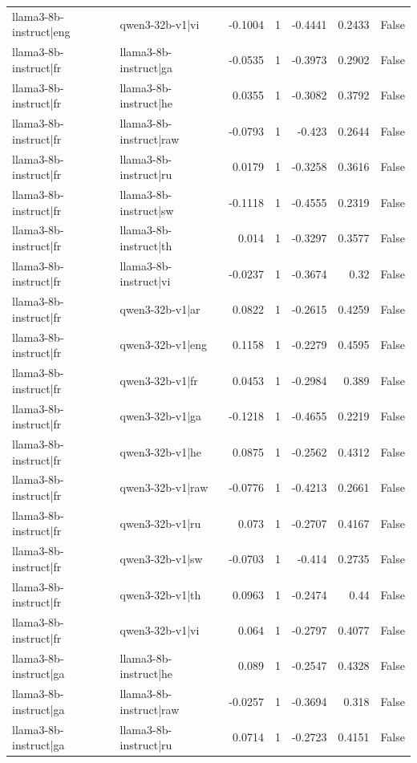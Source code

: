 \begin{table}
\begin{tabular}{l l r r r r l}
llama3-8b-instruct|eng & qwen3-32b-v1|vi & -0.1004 & 1 & -0.4441 & 0.2433 & False \\
llama3-8b-instruct|fr & llama3-8b-instruct|ga & -0.0535 & 1 & -0.3973 & 0.2902 & False \\
llama3-8b-instruct|fr & llama3-8b-instruct|he & 0.0355 & 1 & -0.3082 & 0.3792 & False \\
llama3-8b-instruct|fr & llama3-8b-instruct|raw & -0.0793 & 1 & -0.423 & 0.2644 & False \\
llama3-8b-instruct|fr & llama3-8b-instruct|ru & 0.0179 & 1 & -0.3258 & 0.3616 & False \\
llama3-8b-instruct|fr & llama3-8b-instruct|sw & -0.1118 & 1 & -0.4555 & 0.2319 & False \\
llama3-8b-instruct|fr & llama3-8b-instruct|th & 0.014 & 1 & -0.3297 & 0.3577 & False \\
llama3-8b-instruct|fr & llama3-8b-instruct|vi & -0.0237 & 1 & -0.3674 & 0.32 & False \\
llama3-8b-instruct|fr & qwen3-32b-v1|ar & 0.0822 & 1 & -0.2615 & 0.4259 & False \\
llama3-8b-instruct|fr & qwen3-32b-v1|eng & 0.1158 & 1 & -0.2279 & 0.4595 & False \\
llama3-8b-instruct|fr & qwen3-32b-v1|fr & 0.0453 & 1 & -0.2984 & 0.389 & False \\
llama3-8b-instruct|fr & qwen3-32b-v1|ga & -0.1218 & 1 & -0.4655 & 0.2219 & False \\
llama3-8b-instruct|fr & qwen3-32b-v1|he & 0.0875 & 1 & -0.2562 & 0.4312 & False \\
llama3-8b-instruct|fr & qwen3-32b-v1|raw & -0.0776 & 1 & -0.4213 & 0.2661 & False \\
llama3-8b-instruct|fr & qwen3-32b-v1|ru & 0.073 & 1 & -0.2707 & 0.4167 & False \\
llama3-8b-instruct|fr & qwen3-32b-v1|sw & -0.0703 & 1 & -0.414 & 0.2735 & False \\
llama3-8b-instruct|fr & qwen3-32b-v1|th & 0.0963 & 1 & -0.2474 & 0.44 & False \\
llama3-8b-instruct|fr & qwen3-32b-v1|vi & 0.064 & 1 & -0.2797 & 0.4077 & False \\
llama3-8b-instruct|ga & llama3-8b-instruct|he & 0.089 & 1 & -0.2547 & 0.4328 & False \\
llama3-8b-instruct|ga & llama3-8b-instruct|raw & -0.0257 & 1 & -0.3694 & 0.318 & False \\
llama3-8b-instruct|ga & llama3-8b-instruct|ru & 0.0714 & 1 & -0.2723 & 0.4151 & False \\

\end{tabular}
\end{table}
